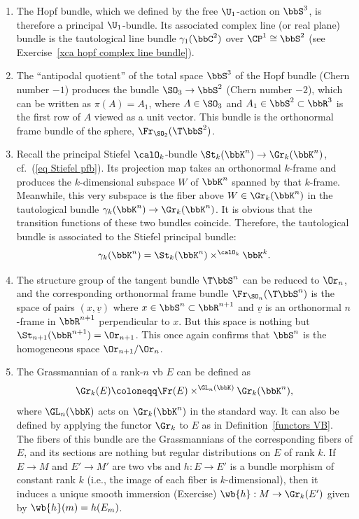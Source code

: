 \begin{example}
\begin{enumerate}
        \item The Hopf bundle, which we defined by the free $\U_1$-action on $\bbS^3$, is therefore a principal $\U_1$-bundle. Its associated complex line (or real plane) bundle is the tautological line bundle $\gamma_1(\bbC^2)$ over $\CP^1\cong\bbS^2$ (see Exercise~\ref{xca hopf complex line bundle}).
        
        \item The ``antipodal quotient'' of the total space $\bbS^3$ of the Hopf bundle (Chern number $-1$) produces the bundle $\SO_3\to \bbS^2$ (Chern number $-2$), which can be written as $\pi(A)=A_1$, where $A\in\SO_3$ and $A_1\in \bbS^2\subset \bbR^3$ is the first row of $A$ viewed as a unit vector. This bundle is the orthonormal frame bundle of the sphere, $\Fr_{\SO_2}(\T\bbS^2)$.
        
        \item Recall the principal Stiefel $\calO_k$-bundle $\St_k(\bbK^n)\to \Gr_k(\bbK^n)$, cf.\ (\ref{eq Stiefel pfb}). Its projection map takes an orthonormal $k$-frame and produces the $k$-dimensional subspace $W$ of $\bbK^n$ spanned by that $k$-frame. Meanwhile, this very subspace is the fiber above $W\in \Gr_k(\bbK^n)$ in the tautological bundle $\gamma_k(\bbK^n)\to \Gr_k(\bbK^n)$. It is obvious that the transition functions of these two bundles coincide. Therefore, the tautological bundle is associated to the Stiefel principal bundle:
        \[\gamma_k(\bbK^n)=\St_k(\bbK^n)\times^{\calO_k}\bbK^k.\]

        \item The structure group of the tangent bundle $\T\bbS^n$ can be reduced to $\Or_n$, and the corresponding orthonormal frame bundle $\Fr_{\SO_n}(\T\bbS^n)$ is the space of pairs $(x,\underline{v})$ where $x\in\bbS^n\subset\bbR^{n+1}$ and $\underline{v}$ is an orthonormal $n$-frame in $\bbR^{n+1}$ perpendicular to $x$. But this space is nothing but $\St_{n+1}(\bbR^{n+1})=\Or_{n+1}$. This once again confirms that $\bbS^n$ is the homogeneous space $\Or_{n+1}\slash \Or_n$.

        \item The Grassmannian of a rank-$n$ \gls{vb} $E$ can be defined as 
        \[\Gr_k(E)\coloneqq \Fr(E)\times^{\GL_n(\bbK)} \Gr_k(\bbK^n),\]
        where $\GL_n(\bbK)$ acts on $\Gr_k(\bbK^n)$ in the standard way. It can also be defined by applying the functor $\Gr_k$ to $E$ as in Definition~\ref{functors VB}. The fibers of this bundle are the Grassmannians of the corresponding fibers of $E$, and its sections are nothing but regular distributions on $E$ of rank $k$.  If $E\to M$ and $E'\to M'$ are two \glspl{vb} and $h:E\to E'$ is a bundle morphism of constant rank $k$ (i.e., the image of each fiber is $k$-dimensional), then it induces a unique smooth immersion (Exercise) $\wb{h}:M\to \Gr_k(E')$ given by $\wb{h}(m)=h(E_m)$.
        

\end{enumerate}
\end{example}
